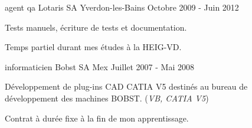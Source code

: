 \begin{cventries}
\cventry
{agent qa} %
{Lotaris SA} %
{Yverdon-les-Bains} %
{Octobre 2009 - Juin 2012} %
{ %
\begin{cvitems}
\item {Tests manuels, écriture de tests et documentation.}
\item {Temps partiel durant mes études à la HEIG-VD.}
\end{cvitems}
}


\cventry
{informaticien} %
{Bobst SA} %
{Mex} %
{Juillet 2007 - Mai 2008} %
{ %
\begin{cvitems}
\item {Développement de plug-ins CAD CATIA V5 destinés au bureau de développement des machines BOBST. (\emph{VB, CATIA V5})}
\item {Contrat à durée fixe à la fin de mon apprentissage.}
\end{cvitems}
}


\end{cventries}
